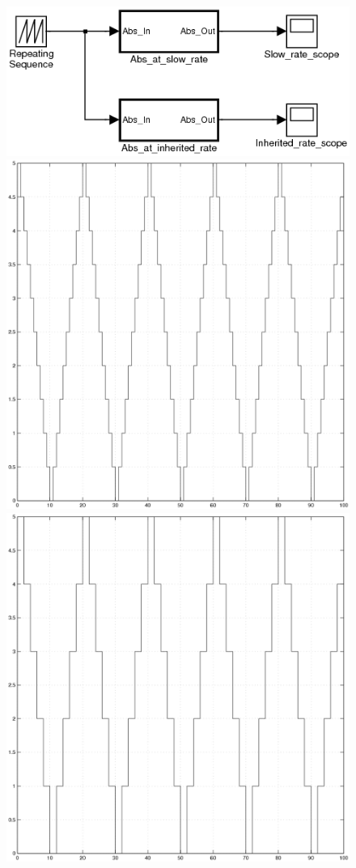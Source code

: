 \begin{figure}
\centering
\includegraphics[scale=0.5]{figs/subsystem_rate_cmp_simulink}\\
\includegraphics[scale=0.3]{figs/inherited_rate_scope}
\hspace{10mm}
\includegraphics[scale=0.3]{figs/step_down_scope}

\end{figure}
